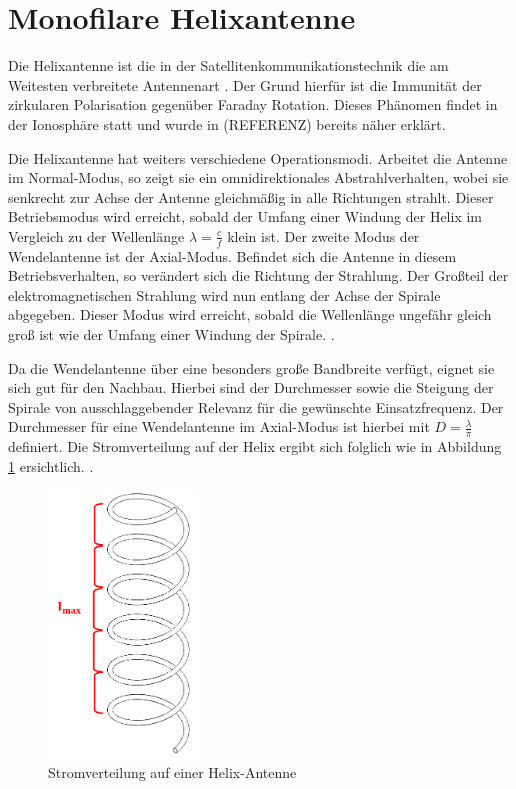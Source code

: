 \section{Monofilare Helixantenne}
Die Helixantenne ist die in der Satellitenkommunikationstechnik die am Weitesten verbreitete Antennenart \cite{HelicalAntennas}. Der Grund hierfür ist die Immunität der zirkularen Polarisation gegenüber Faraday Rotation. Dieses Phänomen findet in der Ionosphäre statt \cite{FaradayRotation} und wurde in (REFERENZ) bereits näher erklärt.

Die Helixantenne hat weiters verschiedene Operationsmodi. Arbeitet die Antenne im Normal-Modus, so zeigt sie ein omnidirektionales Abstrahlverhalten, wobei sie senkrecht zur Achse der Antenne gleichmäßig in alle Richtungen strahlt. Dieser Betriebsmodus wird erreicht, sobald der Umfang einer Windung der Helix im Vergleich zu der Wellenlänge $\lambda=\frac{c}{f}$ klein ist. Der zweite Modus der Wendelantenne ist der Axial-Modus. Befindet sich die Antenne in diesem Betriebsverhalten, so verändert sich die Richtung der Strahlung. Der Großteil der elektromagnetischen Strahlung wird nun entlang der Achse der Spirale abgegeben. Dieser Modus wird erreicht, sobald die Wellenlänge ungefähr gleich groß ist wie der Umfang einer Windung der Spirale. \cite{HelicalAntennas}.

Da die Wendelantenne über eine besonders große Bandbreite verfügt, eignet sie sich gut für den Nachbau. Hierbei sind der Durchmesser sowie die Steigung der Spirale von ausschlaggebender Relevanz für die gewünschte Einsatzfrequenz. Der Durchmesser für eine Wendelantenne im Axial-Modus ist hierbei mit $D=\frac{\lambda}{\pi}$ definiert. Die Stromverteilung auf der Helix ergibt sich folglich wie in Abbildung \ref{fig:CrntDis-Helix} ersichtlich. \cite{HelicalAntennas}.

\begin{figure}[H]
	\centering
	\includegraphics[width=4cm]{../ref/Spirale_Doku}
	\caption{Stromverteilung auf einer Helix-Antenne}
	\label{fig:CrntDis-Helix}
\end{figure}

